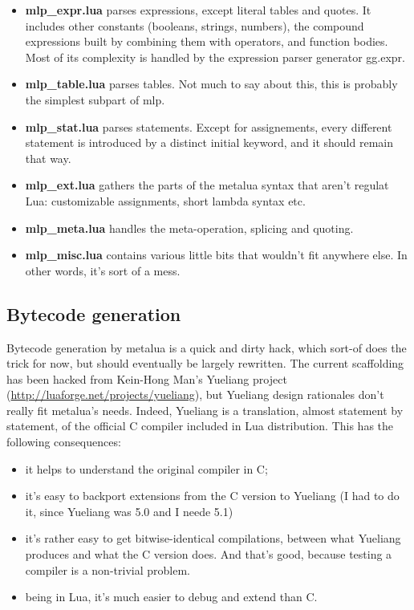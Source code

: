 \begin{itemize}
\item {\bf mlp\_expr.lua} parses expressions, except literal tables
  and quotes. It includes other constants (booleans, strings,
  numbers), the compound expressions built by combining them with
  operators, and function bodies. Most of its complexity is handled by
  the expression parser generator gg.expr.
\item {\bf mlp\_table.lua} parses tables. Not much to say about this,
  this is probably the simplest subpart of mlp.
\item {\bf mlp\_stat.lua} parses statements. Except for assignements,
  every different statement is introduced by a distinct initial
  keyword, and it should remain that way.
\item {\bf mlp\_ext.lua} gathers the parts of the metalua syntax that
  aren't regulat Lua: customizable assignments, short lambda syntax
  etc. 
\item {\bf mlp\_meta.lua} handles the meta-operation, splicing and
  quoting.
\item {\bf mlp\_misc.lua} contains various little bits that wouldn't
  fit anywhere else. In other words, it's sort of a mess.
\end{itemize}

\subsection{Bytecode generation}
Bytecode generation by metalua is a quick and dirty hack, which
sort-of does the trick for now, but should eventually be largely
rewritten. The current scaffolding has been hacked from Kein-Hong
Man's Yueliang project (\url{http://luaforge.net/projects/yueliang}),
but Yueliang design rationales don't really fit metalua's
needs. Indeed, Yueliang is a translation, almost statement by
statement, of the official C compiler included in Lua
distribution. This has the following consequences:

\begin{itemize}
\item it helps to understand the original compiler in C;
\item it's easy to backport extensions from the C version to Yueliang
  (I had to do it, since Yueliang was 5.0 and I neede 5.1)
\item it's rather easy to get bitwise-identical compilations, between
  what Yueliang produces and what the C version does. And that's good,
  because testing a compiler is a non-trivial problem.
\item being in Lua, it's much easier to debug and extend than C.
\end{itemize}

